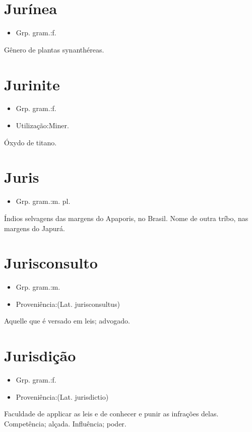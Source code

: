 \documentclass{article}
\begin{document}
\section{Jurínea}
\begin{itemize}
\item {Grp. gram.:f.}
\end{itemize}
Gênero de plantas synanthéreas.
\section{Jurinite}
\begin{itemize}
\item {Grp. gram.:f.}
\end{itemize}
\begin{itemize}
\item {Utilização:Miner.}
\end{itemize}
Óxydo de titano.
\section{Juris}
\begin{itemize}
\item {Grp. gram.:m. pl.}
\end{itemize}
Índios selvagens das margens do Apaporis, no Brasil.
Nome de outra tríbo, nas margens do Japurá.
\section{Jurisconsulto}
\begin{itemize}
\item {Grp. gram.:m.}
\end{itemize}
\begin{itemize}
\item {Proveniência:(Lat. \textunderscore jurisconsultus\textunderscore )}
\end{itemize}
Aquelle que é versado em leis; advogado.
\section{Jurisdição}
\begin{itemize}
\item {Grp. gram.:f.}
\end{itemize}
\begin{itemize}
\item {Proveniência:(Lat. \textunderscore jurisdictio\textunderscore )}
\end{itemize}
Faculdade de applicar as leis e de conhecer e punir as infrações delas.
Competência; alçada.
Influência; poder.
\end{document}

